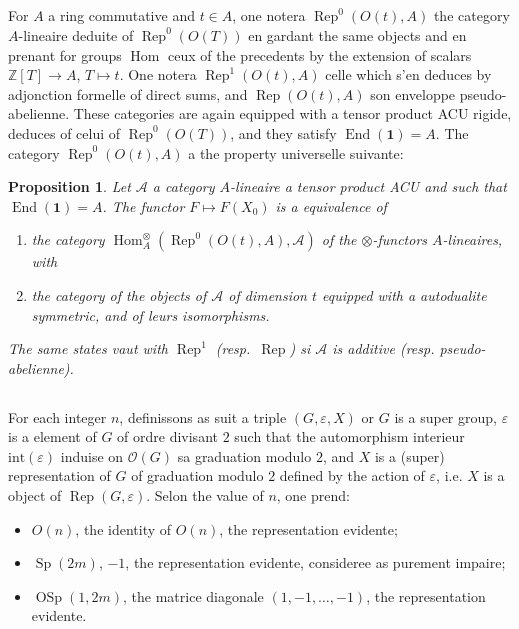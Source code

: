 \documentclass[11pt,a4paper]{article}
\theoremstyle{plain}
\newtheorem{proposition}[theorem]{Proposition}
\theoremstyle{definition}
\DeclareMathOperator{\Hom}{Hom}
\DeclareMathOperator{\End}{End}
\DeclareMathOperator{\Rep}{Rep}
\DeclareMathOperator{\Sp}{Sp}
\DeclareMathOperator{\OSp}{OSp}
\newcommand{\Z}{\mathbb{Z}}
\newcommand{\eps}{\varepsilon}
\begin{document}
\subsection{}
For $A$ a ring commutative and $t \in A$, one notera $\Rep^0(O(t), A)$ the category $A$-lineaire deduite of $\Rep^0(O(T))$ en gardant the same objects and en prenant for groups $\Hom$ ceux of the precedents by the extension of scalars $\Z[T] \to A$, $T \mapsto t$. One notera $\Rep^1(O(t), A)$ celle which s'en deduces by adjonction formelle of direct sums, and $\Rep(O(t), A)$ son enveloppe pseudo-abelienne. These categories are again equipped with a tensor product ACU rigide, deduces of celui of $\Rep^0(O(T))$, and they satisfy $\End(\mathbf{1}) = A$. The category $\Rep^0(O(t), A)$ a the property universelle suivante:

\begin{proposition}
Let $\mathcal{A}$ a category $A$-lineaire a tensor product ACU and such that $\End(\mathbf{1}) = A$. The functor $F \mapsto F(X_0)$ is a equivalence of
\begin{enumerate}[label=(\alph*)]
\item the category $\Hom^{\otimes}_A(\Rep^0(O(t), A), \mathcal{A})$ of the $\otimes$-functors $A$-lineaires, with
\item the category of the objects of $\mathcal{A}$ of dimension $t$ equipped with a autodualite symmetric, and of leurs isomorphisms.
\end{enumerate}

The same states vaut with $\Rep^1$ (resp.~$\Rep$) si $\mathcal{A}$ is additive (resp. pseudo-abelienne).
\end{proposition}

\subsection{}
For each integer $n$, definissons as suit a triple $(G, \eps, X)$ or $G$ is a super group, $\eps$ is a element of $G$ of ordre divisant $2$ such that the automorphism interieur $\text{int}(\eps)$ induise on $\mathcal{O}(G)$ sa graduation modulo $2$, and $X$ is a (super) representation of $G$ of graduation modulo $2$ defined by the action of $\eps$, i.e. $X$ is a object of $\Rep(G, \eps)$. Selon the value of $n$, one prend:
\begin{itemize}[label={},leftmargin=*]
\item[$n \geq 0$:] $O(n)$, the identity of $O(n)$, the representation evidente;
\item[$n = -2m \leq 0$:] $\Sp(2m)$, $-1$, the representation evidente, consideree as purement impaire;
\item[$n = 1 - 2m \leq 0$:] $\OSp(1, 2m)$, the matrice diagonale $(1, -1, \ldots, -1)$, the representation evidente.
\end{itemize}
\end{document}
